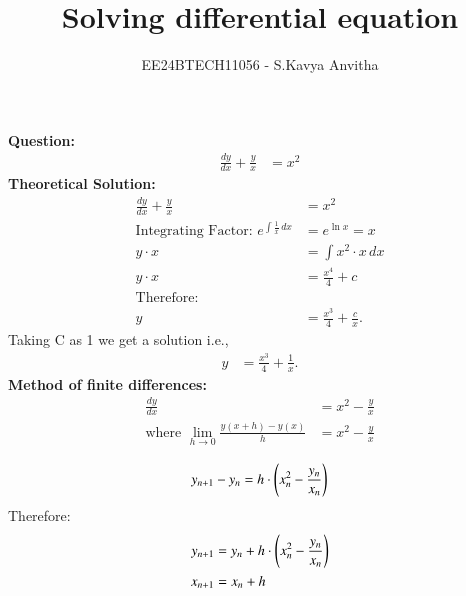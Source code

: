 \documentclass[journal]{IEEEtran}
\begin{document}

\vspace{3cm}

\title{Solving differential equation}
\author{EE24BTECH11056 - S.Kavya Anvitha}
\maketitle
\bigskip

\renewcommand{\thefigure}{\theenumi}
\renewcommand{\thetable}{\theenumi}
\textbf{Question:}
\begin{align}
\frac{dy}{dx}+\frac{y}{x} &= x^2
\end{align}
\textbf{Theoretical Solution:}
\begin{align}
    \frac{dy}{dx} + \frac{y}{x} &= x^2 \\
    \text{Integrating Factor: }
    e^{\int \frac{1}{x} \,dx} &= e^{\ln{x}} = x \\
    y \cdot x &= \int x^2 \cdot x \,dx \\
    y \cdot x &= \frac{x^4}{4} + c \\
    \text{Therefore:}\\
    y &= \frac{x^3}{4} + \frac{c}{x}.
\end{align}
Taking C as 1 we get a solution i.e.,
\begin{align}
y &= \frac{x^3}{4} + \frac{1}{x}.
\end{align}
\textbf{Method of finite differences:}
\begin{align}
    \frac{dy}{dx} &= x^2 - \frac{y}{x} \\
    \text{where } \lim_{h \to 0} \frac{y(x+h) - y(x)}{h} &= x^2 - \frac{y}{x} \\
    \end{align}
    \begin{align}
    y_{n+1} - y_n &= h \cdot \left(x_{n}^2 - \frac{y_n}{x_n}\right) \\
    \end{align}
    Therefore:
    \begin{align}
    y_{n+1} &= y_n + h \cdot \left(x_{n}^2 - \frac{y_n}{x_n}\right) \\
    x_{n+1} &= x_n + h
\end{align}
\end{document}
